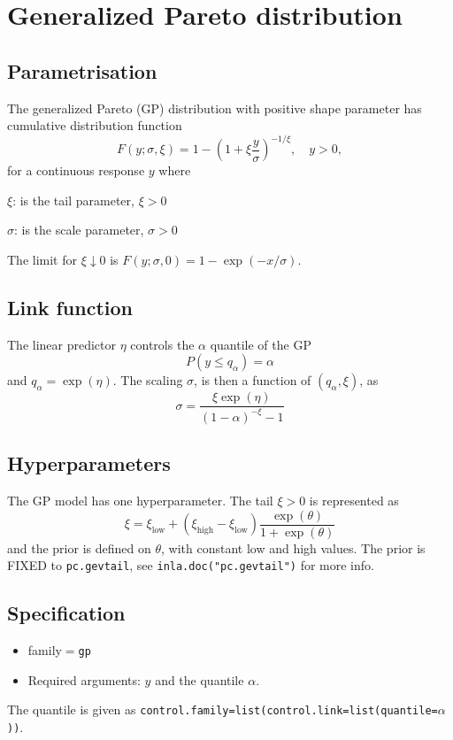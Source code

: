 \documentclass[12pt]{article}
\begin{document}
\section*{Generalized Pareto distribution}
\subsection*{Parametrisation}
The generalized Pareto (GP) distribution with positive shape parameter
has cumulative distribution function
$$
F(y;\sigma,\xi)=1-\left(1+\xi\frac{y}{\sigma}\right)^{-1/\xi},
\quad y>0,
$$
for a continuous response $y$ where
\begin{description}
\item $\xi$: is the tail parameter, $\xi>0$
\item $\sigma$: is the scale parameter, $\sigma>0$
\end{description}
The limit for $\xi\downarrow 0$ is
$F(y;\sigma,0)=1-\exp(-x/\sigma)$.

\subsection*{Link function}

The linear predictor $\eta$ controls the $\alpha$ quantile of
the GP
\begin{displaymath}
    P(y \le q_{\alpha}) = \alpha
\end{displaymath}
and $q_{\alpha} = \exp(\eta)$. The scaling $\sigma$, is then a
function of $(q_{\alpha}, \xi)$, as
\begin{displaymath}
    \sigma = \frac{\xi\exp(\eta)}{(1-\alpha)^{-\xi}-1}
\end{displaymath}

\subsection*{Hyperparameters}
The $\mathrm{GP}$ model has one hyperparameter. The tail $\xi>0$ is
represented as
$$
\xi = \xi_{\text{low}} + (\xi_{\text{high}} - \xi_{\text{low}})
\frac{\exp(\theta)}{1 + \exp(\theta)}
$$
and the prior is defined on $\theta$, with constant low and high
values. The prior is FIXED to \texttt{pc.gevtail}, see
\texttt{inla.doc("pc.gevtail")} for more info.

\subsection*{Specification}
\begin{itemize}
\item family$=$\texttt{gp}
\item Required arguments: $y$ and the quantile $\alpha$. 
\end{itemize}
The quantile is given as \texttt{control.family=list(control.link=list(quantile=$\alpha$))}.
\end{document}
